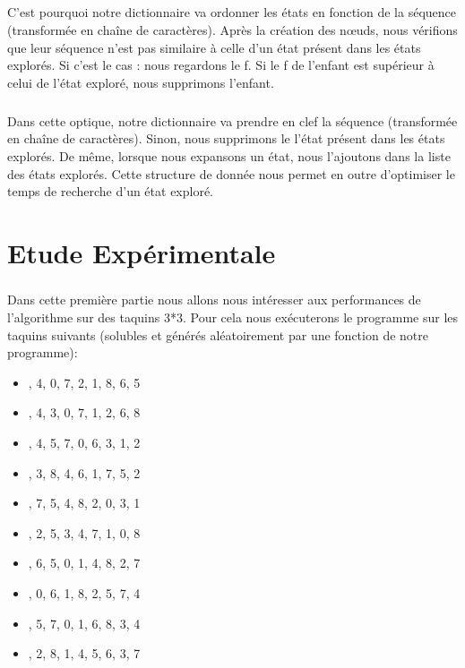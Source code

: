 \documentclass[10pt,a4paper]{report}
\begin{document}
\paragraph{}{C'est pourquoi notre dictionnaire va ordonner les états en fonction de la séquence (transformée en chaîne de caractères). Après la création des nœuds, nous vérifions que leur séquence n'est pas similaire à celle d'un état présent dans les états explorés. Si c'est le cas : nous regardons le f. Si le f de l'enfant est supérieur à celui de l'état exploré, nous supprimons l'enfant.}
\paragraph{}{Dans cette optique, notre dictionnaire va prendre en clef la séquence (transformée en chaîne de caractères). Sinon, nous supprimons le l'état présent dans les états explorés. De même, lorsque nous expansons un état, nous l'ajoutons dans la liste des états explorés. Cette structure de donnée nous permet en outre d'optimiser le temps de recherche d'un état exploré.}



\chapter{Etude Expérimentale}
\paragraph{}{Dans cette première partie nous allons nous intéresser aux performances de l'algorithme sur des taquins 3*3. Pour cela nous exécuterons le programme sur les taquins suivants (solubles et générés aléatoirement par une fonction de notre programme): }
\begin{itemize}
\item {}, 4, 0, 7, 2, 1, 8, 6, 5\rbrack
\item {}, 4, 3, 0, 7, 1, 2, 6, 8\rbrack
\item {}, 4, 5, 7, 0, 6, 3, 1, 2\rbrack
\item {}, 3, 8, 4, 6, 1, 7, 5, 2\rbrack
\item {}, 7, 5, 4, 8, 2, 0, 3, 1\rbrack
\item {}, 2, 5, 3, 4, 7, 1, 0, 8\rbrack
\item {}, 6, 5, 0, 1, 4, 8, 2, 7\rbrack
\item {}, 0, 6, 1, 8, 2, 5, 7, 4\rbrack
\item {}, 5, 7, 0, 1, 6, 8, 3, 4\rbrack
\item {}, 2, 8, 1, 4, 5, 6, 3, 7\rbrack
\end{itemize}
\end{document}
